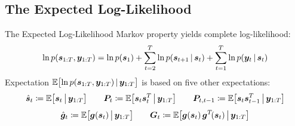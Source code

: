 \documentclass[
	aspectratio=43,
	color={accentcolor=1c},
	logo=false,
	colorframetitle=true,
]{tudabeamer}
\begin{document}
		\subsection{The Expected Log-Likelihood}
			\begin{frame}{The Expected Log-Likelihood}
				Markov property yields complete log-likelihood:
				\begin{align*}
					\ln p(\bm{s}_{1:T}, \bm{y}_{1:T}) = \ln p(\bm{s}_1) + \sum_{t = 2}^{T} \ln p(\bm{s}_{t + 1} \,\vert\, \bm{s}_t) + \sum_{t = 1}^{T} \ln p(\bm{y}_t \,\vert\, \bm{s}_t)
				\end{align*}
				Expectation \( \mathbb{E}\big[\! \ln p(\bm{s}_{1:T}, \bm{y}_{1:T}) \,\vert\, \bm{y}_{1:T} \big] \) is based on five other expectations:
				\begin{align*}
					\hat{\bm{s}}_t \coloneqq \mathbb{E}\big[ \bm{s}_t \,\big\vert\, \bm{y}_{1:T} \big]
					\qquad
					\bm{P}_t \coloneqq \mathbb{E}\big[ \bm{s}_t \bm{s}_t^T \,\big\vert\, \bm{y}_{1:T} \big]
					\qquad
					\bm{P}_{t, t - 1} \coloneqq \mathbb{E}\big[ \bm{s}_t \bm{s}_{t - 1}^T \,\big\vert\, \bm{y}_{1:T} \big]
				\end{align*}
				\begin{align*}
					\hat{\bm{g}}_t \coloneqq \mathbb{E}\big[ \bm{g}(\bm{s}_t) \,\big\vert\, \bm{y}_{1:T} \big]
					\qquad
					\bm{G}_t \coloneqq \mathbb{E}\big[ \bm{g}(\bm{s}_t) \, \bm{g}^T\!(\bm{s}_t) \,\big\vert\, \bm{y}_{1:T} \big]
				\end{align*}
			\end{frame}


\end{document}
